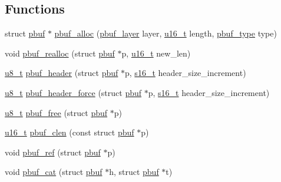 \subsection*{Functions}
\begin{DoxyCompactItemize}
\item 
struct \hyperlink{structpbuf}{pbuf} $\ast$ \hyperlink{group__pbuf_ga8bb9c5d54a06995b1c67ce695ead9969}{pbuf\+\_\+alloc} (\hyperlink{group__pbuf_gaee1baa59bb2f85ba575b5a8619ac1ebf}{pbuf\+\_\+layer} layer, \hyperlink{group__compiler__abstraction_ga77570ac4fcab86864fa1916e55676da2}{u16\+\_\+t} length, \hyperlink{group__pbuf_gab7e0e32fcc292c0d7107721766ed92fb}{pbuf\+\_\+type} type)
\item 
void \hyperlink{group__pbuf_ga50abfe830a33a1a47a562febee66015d}{pbuf\+\_\+realloc} (struct \hyperlink{structpbuf}{pbuf} $\ast$p, \hyperlink{group__compiler__abstraction_ga77570ac4fcab86864fa1916e55676da2}{u16\+\_\+t} new\+\_\+len)
\item 
\hyperlink{group__compiler__abstraction_ga4caecabca98b43919dd11be1c0d4cd8e}{u8\+\_\+t} \hyperlink{openmote-cc2538_2lwip_2src_2core_2pbuf_8c_a0f81deff4a0e6e8e0ff161a7b9871449}{pbuf\+\_\+header} (struct \hyperlink{structpbuf}{pbuf} $\ast$p, \hyperlink{group__compiler__abstraction_gacf46f4df0ebab84edebcb69967fdf86b}{s16\+\_\+t} header\+\_\+size\+\_\+increment)
\item 
\hyperlink{group__compiler__abstraction_ga4caecabca98b43919dd11be1c0d4cd8e}{u8\+\_\+t} \hyperlink{openmote-cc2538_2lwip_2src_2core_2pbuf_8c_ad0e64d6fbc423593461063da97da9ce6}{pbuf\+\_\+header\+\_\+force} (struct \hyperlink{structpbuf}{pbuf} $\ast$p, \hyperlink{group__compiler__abstraction_gacf46f4df0ebab84edebcb69967fdf86b}{s16\+\_\+t} header\+\_\+size\+\_\+increment)
\item 
\hyperlink{group__compiler__abstraction_ga4caecabca98b43919dd11be1c0d4cd8e}{u8\+\_\+t} \hyperlink{group__pbuf_gab0dd696fb4b6bc65e548944584f1738b}{pbuf\+\_\+free} (struct \hyperlink{structpbuf}{pbuf} $\ast$p)
\item 
\hyperlink{group__compiler__abstraction_ga77570ac4fcab86864fa1916e55676da2}{u16\+\_\+t} \hyperlink{openmote-cc2538_2lwip_2src_2core_2pbuf_8c_a5df7ac5ae59012fe9aeddba375a72190}{pbuf\+\_\+clen} (const struct \hyperlink{structpbuf}{pbuf} $\ast$p)
\item 
void \hyperlink{group__pbuf_ga77f6bbd69e45e542014d9c547c7da74e}{pbuf\+\_\+ref} (struct \hyperlink{structpbuf}{pbuf} $\ast$p)
\item 
void \hyperlink{group__pbuf_ga82429084fe29015509c9b4a072707cd4}{pbuf\+\_\+cat} (struct \hyperlink{structpbuf}{pbuf} $\ast$h, struct \hyperlink{structpbuf}{pbuf} $\ast$t)

\end{DoxyCompactItemize}
